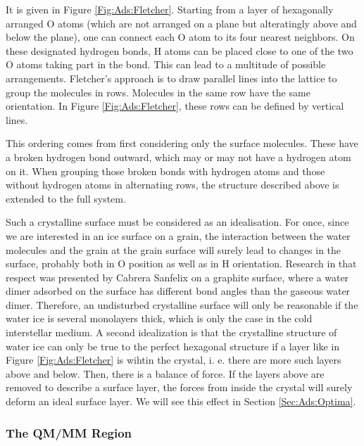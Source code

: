 \documentclass[8.5pt,twoside,twocolumn]{article}
\theoremstyle{standard}
\begin{document}
It is given in Figure \ref{Fig:Ads:Fletcher}. Starting from a layer of
hexagonally arranged O atoms (which are not arranged on a plane but 
alteratingly above and below the plane), one can connect each O atom to its
four nearest neighbors. On these designated hydrogen bonds, H atoms can be placed close
to one of the two O atoms taking part in the bond. This can lead to a multitude
of possible arrangements. Fletcher's approach is to draw parallel
lines into the lattice to group the molecules in rows. Molecules in the
same row have the same orientation. In Figure \ref{Fig:Ads:Fletcher}, these
rows can be defined by vertical lines.

This ordering comes from first considering only the surface molecules. These
have a broken hydrogen bond outward, which may or may not have a hydrogen
atom on it. When grouping those broken bonds with hydrogen atoms and those
without hydrogen atoms in alternating rows, the structure described above is
extended to the full system.

Such a crystalline surface must be considered as an idealisation. For once,
since we are interested in an ice surface on a grain, the interaction between
the water molecules and the grain at the grain surface will surely lead to
changes in the surface, probably both in O position as well as in H orientation.
Research in that respect was presented by Cabrera Sanfelix
\etal\cite{CabreraSanfelix2003} on a graphite surface, where a water dimer
adsorbed on the surface has different bond angles than the gaseous water dimer.
Therefore, an undisturbed crystalline surface will only be reasonable if the
water ice is several monolayers thick, which is only the case in the cold
interstellar medium. A second idealization is that the crystalline structure of
water ice can only be true to the perfect hexagonal structure if a layer like in
Figure \ref{Fig:Ads:Fletcher} is wihtin the crystal, i. e. there are more such
layers above and below. Then, there is a balance of force. If the layers
above are removed to describe a surface layer, the forces from inside the crystal will
surely deform an ideal surface layer. We will see this effect in Section
\ref{Sec:Ads:Optima}.

\subsubsection{The QM/MM Region}
\label{Sec:Ads:QM/MM}
\end{document}
